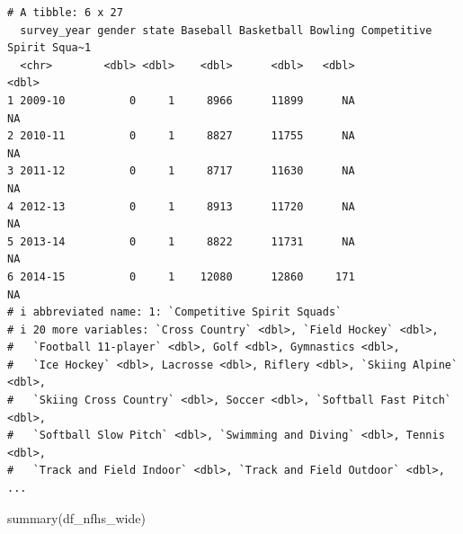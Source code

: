 \documentclass[
  letterpaper,
  DIV=11,
  numbers=noendperiod]{scrartcl}
\newenvironment{Shaded}{\begin{snugshade}}{\end{snugshade}}
\newcommand{\FunctionTok}[1]{\textcolor[rgb]{0.28,0.35,0.67}{#1}}
\newcommand{\NormalTok}[1]{\textcolor[rgb]{0.00,0.23,0.31}{#1}}
\begin{document}
\begin{verbatim}
# A tibble: 6 x 27
  survey_year gender state Baseball Basketball Bowling Competitive Spirit Squa~1
  <chr>        <dbl> <dbl>    <dbl>      <dbl>   <dbl>                     <dbl>
1 2009-10          0     1     8966      11899      NA                        NA
2 2010-11          0     1     8827      11755      NA                        NA
3 2011-12          0     1     8717      11630      NA                        NA
4 2012-13          0     1     8913      11720      NA                        NA
5 2013-14          0     1     8822      11731      NA                        NA
6 2014-15          0     1    12080      12860     171                        NA
# i abbreviated name: 1: `Competitive Spirit Squads`
# i 20 more variables: `Cross Country` <dbl>, `Field Hockey` <dbl>,
#   `Football 11-player` <dbl>, Golf <dbl>, Gymnastics <dbl>,
#   `Ice Hockey` <dbl>, Lacrosse <dbl>, Riflery <dbl>, `Skiing Alpine` <dbl>,
#   `Skiing Cross Country` <dbl>, Soccer <dbl>, `Softball Fast Pitch` <dbl>,
#   `Softball Slow Pitch` <dbl>, `Swimming and Diving` <dbl>, Tennis <dbl>,
#   `Track and Field Indoor` <dbl>, `Track and Field Outdoor` <dbl>, ...
\end{verbatim}

\begin{Shaded}
\begin{Highlighting}[]
\FunctionTok{summary}\NormalTok{(df\_nfhs\_wide)}
\end{Highlighting}
\end{Shaded}
\end{document}
